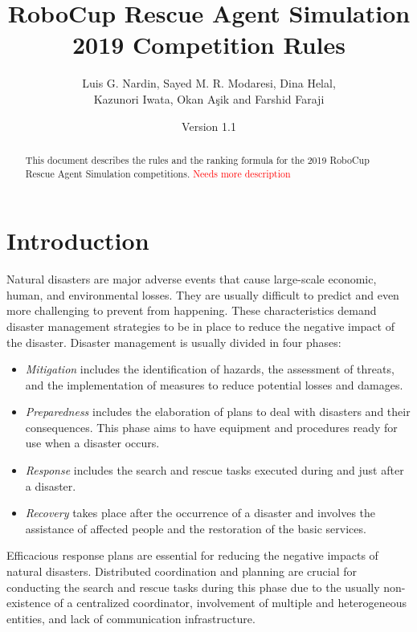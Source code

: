 \documentclass{article}
\begin{document}

\title{RoboCup Rescue Agent Simulation\\
       2019 Competition Rules}
\author{Luis G. Nardin, Sayed M. R. Modaresi, Dina Helal,\\
Kazunori Iwata, Okan A{\c s}ik and Farshid Faraji}
\date{Version 1.1}
\maketitle
\begin{abstract}
This document describes the rules and the ranking formula for the 2019 RoboCup Rescue Agent Simulation competitions.
 \textcolor{red}{Needs more description}
\end{abstract}
\section{Introduction}
\label{sec:introduction}
Natural disasters are major adverse events that cause large-scale economic, human, and environmental losses. They are usually difficult to predict and even more challenging to prevent from happening. These characteristics demand disaster management strategies to be in place to reduce the negative impact of the disaster. Disaster management is usually divided in four phases:
\begin{itemize}
\item \emph{Mitigation} includes the identification of hazards, the assessment of threats, and the implementation of measures to reduce potential losses and damages.
\item \emph{Preparedness} includes the elaboration of plans to deal with disasters and their consequences. This phase aims to have equipment and procedures ready for use when a disaster occurs.
\item \emph{Response} includes the search and rescue tasks executed during and just after a disaster.
\item \emph{Recovery} takes place after the occurrence of a disaster and involves the assistance of affected people and the restoration of the basic services.
\end{itemize}

Efficacious response plans are essential for reducing the negative impacts of natural disasters. Distributed coordination and planning are crucial for conducting the search and rescue tasks during this phase due to the usually non-existence of a centralized coordinator, involvement of multiple and heterogeneous entities, and lack of communication infrastructure.
\end{document}
